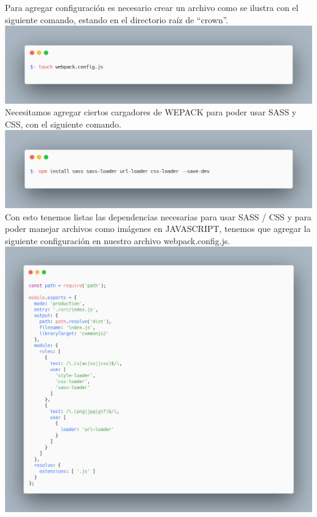 Para agregar configuración es necesario crear un archivo como se ilustra con el siguiente comando, estando en el directorio raíz de “crown”.
\newline
\newline
\includegraphics[width=1\textwidth]{./Imagenes/image38.png}
\newline
Necesitamos agregar ciertos cargadores de WEPACK para poder usar SASS y CSS, con el siguiente comando.
\newline
\newline
\includegraphics[width=1\textwidth]{./Imagenes/image8.png}
\newline
\newline
Con esto tenemos listas las dependencias necesarias para usar SASS / CSS y para poder manejar archivos como imágenes en JAVASCRIPT, tenemos que agregar la siguiente configuración en nuestro archivo webpack.config.js.
\newline
\newline
\includegraphics[width=1\textwidth]{./Imagenes/image2.png}
